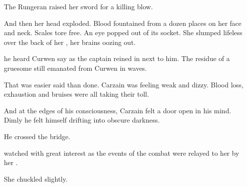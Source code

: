 
The Rungeran raised her sword for a killing blow. 

And then her head exploded. 
Blood fountained from a dozen places on her face and neck. 
Scales tore free. 
An eye popped out of its socket. 
She slumped lifeless over the back of her \relc, her brains oozing out.  

 he heard Curwen say as the captain reined in next to him. 
The residue of a gruesome \qliphah{} still emanated from Curwen in waves. 


That was easier said than done. 
Carzain was feeling weak and dizzy. 
Blood loss, exhaustion and bruises were all taking their toll. 

And at the edges of his consciousness, Carzain felt a door open in his mind. 
Dimly he felt himself drifting into obscure darkness. 

He crossed the bridge. 









\begin{comment}
\subsection{\Takestsha{} watches fight}
\end{comment}
\new
\Takestsha{} watched with great interest as the events of the combat were relayed to her by her . 

She chuckled slightly.

